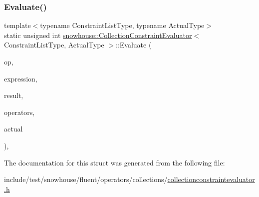 \subsubsection{\texorpdfstring{Evaluate()}{Evaluate()}}
{\footnotesize\ttfamily template$<$typename Constraint\+List\+Type, typename Actual\+Type$>$ \\
static unsigned int \mbox{\hyperlink{structsnowhouse_1_1CollectionConstraintEvaluator}{snowhouse\+::\+Collection\+Constraint\+Evaluator}}$<$ Constraint\+List\+Type, Actual\+Type $>$\+::Evaluate (\begin{DoxyParamCaption}\item[{const \mbox{\hyperlink{structsnowhouse_1_1ConstraintOperator}{Constraint\+Operator}} \&}]{op,  }\item[{Constraint\+List\+Type \&}]{expression,  }\item[{\mbox{\hyperlink{namespacesnowhouse_a719169b1315a13161c15f25e600a8f51}{Result\+Stack}} \&}]{result,  }\item[{\mbox{\hyperlink{namespacesnowhouse_adcb10e215e6a4bbcb35722a9c7270fc6}{Operator\+Stack}} \&}]{operators,  }\item[{const Actual\+Type \&}]{actual }\end{DoxyParamCaption})\hspace{0.3cm}{\ttfamily [inline]}, {\ttfamily [static]}}



The documentation for this struct was generated from the following file\+:\begin{DoxyCompactItemize}
\item 
include/test/snowhouse/fluent/operators/collections/\mbox{\hyperlink{collectionconstraintevaluator_8h}{collectionconstraintevaluator.\+h}}\end{DoxyCompactItemize}
